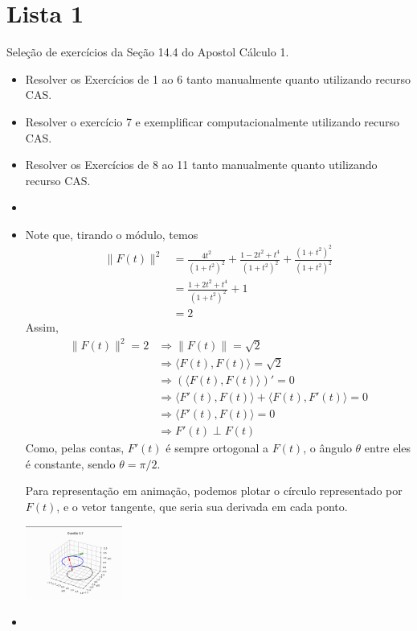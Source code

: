 \documentclass[../main.tex]{subfiles}
\begin{document}
	
	\section{Lista 1}
	\begin{exercicio}{1}
		Seleção de exercícios da Seção 14.4 do Apostol Cálculo 1.
		\begin{itemize}
			\item Resolver os Exercícios de 1 ao 6 tanto manualmente quanto utilizando recurso CAS.
			\item Resolver o exercício 7 e exemplificar computacionalmente utilizando recurso CAS.
			\item Resolver os Exercícios de 8 ao 11 tanto manualmente quanto utilizando recurso CAS.
		\end{itemize}
	\end{exercicio}
	\begin{solucao}
		\begin{itemize}
			\item 
			\item Note que, tirando o módulo, temos
			\begin{align*}
				\|F(t)\|^2 &=\frac{4t^2}{(1+t^2)^2}+\frac{1-2t^2+t^4}{(1+t^2)^2}+\frac{(1+t^2)^2}{(1+t^2)^2}\\
				&=\frac{1+2t^2+t^4}{(1+t^2)^2}+1\\
				&=2
			\end{align*}
			Assim,
			\begin{align*}
				\|F(t)\|^2=2
				&\Rightarrow \|F(t)\|=\sqrt{2}\\
				&\Rightarrow \langle F(t), F(t) \rangle =\sqrt{2}\\
				&\Rightarrow (\langle F(t), F(t) \rangle)'=0\\
				&\Rightarrow \langle F'(t), F(t) \rangle + \langle F(t), F'(t) \rangle = 0\\
				&\Rightarrow \langle F'(t), F(t) \rangle = 0\\
				&\Rightarrow F'(t) \perp F(t)
			\end{align*}
			Como, pelas contas, $F'(t)$ é sempre ortogonal a $F(t)$, o ângulo $\theta$ entre eles é constante, sendo $\theta=\pi/2$.
			
			Para representação em animação, podemos plotar o círculo representado por $F(t)$, e o vetor tangente, que seria sua derivada em cada ponto.
			
			\begin{center}
				\includegraphics[width=0.25\textwidth]{imagens/lista01/picture_lista01_q01_item07.png}
			\end{center}
			\item 
		\end{itemize}
	\end{solucao}
	
\end{document}
